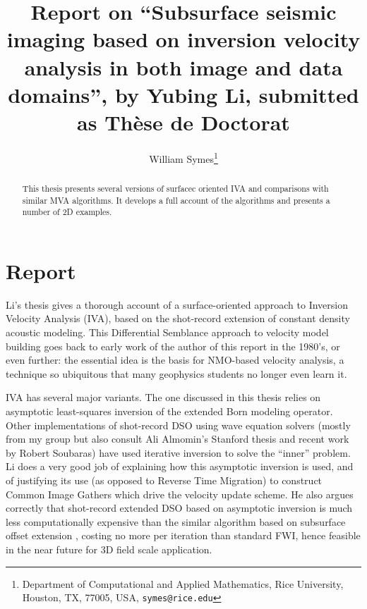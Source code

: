 \title{Report on ``Subsurface seismic imaging based on inversion velocity analysis in both image and data domains'', by Yubing Li, submitted as Th\`{e}se de Doctorat}

\author{
William Symes\thanks{Department of Computational and Applied Mathematics, Rice University,
Houston, TX, 77005, USA,
{\tt symes@rice.edu}}
}



\maketitle

\begin{abstract}
This thesis presents several versions of surfacec oriented IVA and comparisons with similar MVA algorithms. It develops a full account of the algorithms and presents a number of 2D examples.
\end{abstract}

\section{Report}
Li's thesis gives a thorough account of a surface-oriented approach to Inversion Velocity Analysis (IVA), based on the shot-record extension of constant density acoustic modeling. This Differential Semblance approach to velocity model building goes back to early work of the author of this report in the 1980's, or even further: the essential idea is the basis for NMO-based velocity analysis, a technique so ubiquitous that many geophysics students no longer even learn it.

IVA has several major variants. The one discussed in this thesis relies on asymptotic least-squares inversion of the extended Born modeling operator. Other implementations of shot-record DSO using wave equation solvers (mostly from my group \cite[]{KerSy:94,HuangSymes:SEG15,YinHuang:16} but also consult Ali Almomin's Stanford thesis and recent work by Robert Soubaras) have used iterative inversion to solve the ``inner'' problem. Li does a very good job of explaining how this asymptotic inversion is used, and of justifying its use (as opposed to Reverse Time Migration) to construct Common Image Gathers which drive the velocity update scheme. He also argues correctly that shot-record extended DSO based on asymptotic inversion is much less computationally expensive than the similar algorithm based on subsurface offset extension \cite[]{HouSymes:SEG16a,Herve2017}, costing no more per iteration than standard FWI, hence feasible in the near future for 3D field scale application.


